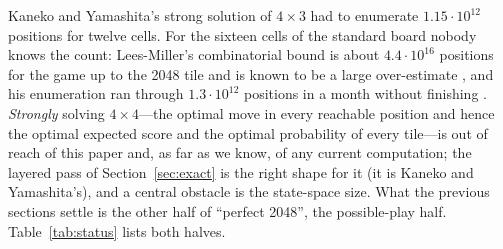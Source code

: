 \documentclass[11pt]{article}
\theoremstyle{definition}
\theoremstyle{remark}
\begin{document}
Kaneko and Yamashita's strong solution of $4\times3$ \cite{kaneko2026}
had to enumerate $1.15\cdot10^{12}$ positions for twelve cells. For the
sixteen cells of the standard board nobody knows the count: Lees-Miller's
combinatorial bound is about $4.4\cdot10^{16}$ positions for the game up
to the 2048 tile and is known to be a large over-estimate
\cite{leesmiller2017c}, and his enumeration ran through
$1.3\cdot10^{12}$ positions in a month without finishing
\cite{leesmiller2017b}. \emph{Strongly} solving $4\times4$---the
optimal move in every reachable position and hence the optimal expected
score and the optimal probability of every tile---is out of reach of this
paper and, as far as we know, of any current computation; the layered
pass of Section~\ref{sec:exact} is the right shape for it (it is
Kaneko and Yamashita's), and a central obstacle is the state-space size. What the
previous sections settle is the other half of ``perfect 2048'', the
possible-play half. Table~\ref{tab:status} lists both halves.
\end{document}
